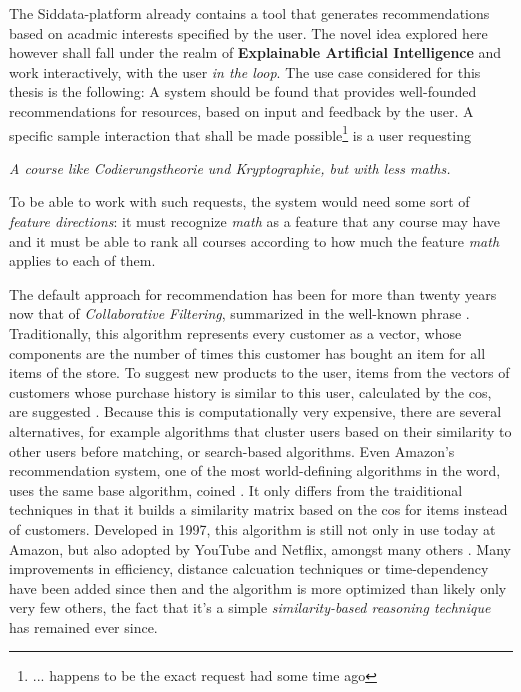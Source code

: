 The Siddata-platform already contains a tool that generates recommendations based on acadmic interests specified by the user. The novel idea explored here however shall fall under the realm of \textbf{Explainable Artificial Intelligence} and work interactively, with the user \textit{in the loop}. The use case considered for this thesis is the following: A system should be found that provides well-founded recommendations for resources, based on input and feedback by the user. A specific sample interaction that shall be made possible\footnote{... happens to be the exact request \me had some time ago} is a user requesting 
\begin{displayquote}
	\textit{\guillemotright A course like \emph{Codierungstheorie und Kryptographie}, but with less maths.\guillemotleft}
\end{displayquote}

To be able to work with such requests, the system would need some sort of \textit{feature directions}: it must recognize \emph{math} as a feature that any course may have and it must be able to rank all courses according to how much the feature \emph{math} applies to each of them.


\label{sec:amazonalgo}

The default approach for recommendation has been for more than twenty years now that of \emph{Collaborative Filtering}, summarized in the well-known phrase  \cite{Sarwar2000}. Traditionally, this algorithm represents every customer as a vector, whose components are the number of times this customer has bought an item for all items of the store. To suggest new products to the user, items from the vectors of customers whose purchase history is similar to this user, calculated by \eg the \gls{cos}, are suggested \cite{Linden2003}. Because this is computationally very expensive, there are several alternatives, for example algorithms that cluster users based on their similarity to other users before matching, or search-based algorithms. Even Amazon's recommendation system, one of the most world-defining algorithms in the word, uses the same base algorithm, coined . It only differs from the traiditional techniques in that it builds a similarity matrix based on the \gls{cos} for items instead of customers. Developed in 1997, this algorithm is still not only in use today at Amazon, but also adopted by YouTube and Netflix, amongst many others \cite{Smith2017}. Many improvements in efficiency, distance calcuation techniques or time-dependency have been added since then and the algorithm is more optimized than likely only very few others, the fact that it's a simple \textit{similarity-based reasoning technique} has remained ever since. 

